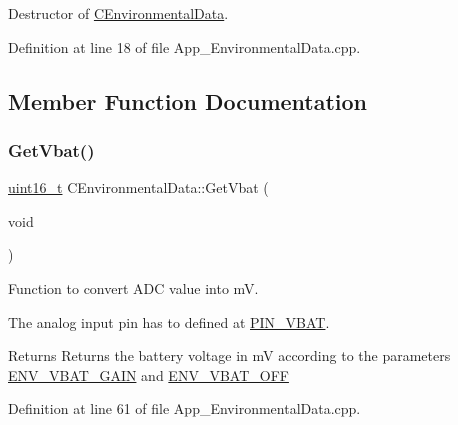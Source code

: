 Destructor of \mbox{\hyperlink{class_c_environmental_data}{C\+Environmental\+Data}}. 



Definition at line 18 of file App\+\_\+\+Environmental\+Data.\+cpp.



\subsection{Member Function Documentation}
\mbox{\label{class_c_environmental_data_a12a6d60a2a0aa406beb82375fa60e875}} 
\subsubsection{\texorpdfstring{GetVbat()}{GetVbat()}}
{\footnotesize\ttfamily \mbox{\hyperlink{_a_d_a_s___types_8h_a1f1825b69244eb3ad2c7165ddc99c956}{uint16\+\_\+t}} C\+Environmental\+Data\+::\+Get\+Vbat (\begin{DoxyParamCaption}\item[{void}]{ }\end{DoxyParamCaption})\hspace{0.3cm}{\ttfamily [virtual]}}



Function to convert A\+DC value into mV. 

The analog input pin has to defined at \mbox{\hyperlink{_a_d_a_s___cfg_8h_ad9c869803f9fc9e3ffc9e962c19f028d}{P\+I\+N\+\_\+\+V\+B\+AT}}. \begin{DoxyReturn}{Returns}
Returns the battery voltage in mV according to the parameters \mbox{\hyperlink{_a_d_a_s___cfg_8h_a9b007d258cc627ea79aa06cef42c0851}{E\+N\+V\+\_\+\+V\+B\+A\+T\+\_\+\+G\+A\+IN}} and \mbox{\hyperlink{_a_d_a_s___cfg_8h_a60f7517e6d36bf5703fc24eacb2f17ed}{E\+N\+V\+\_\+\+V\+B\+A\+T\+\_\+\+O\+FF}} 
\end{DoxyReturn}


Definition at line 61 of file App\+\_\+\+Environmental\+Data.\+cpp.

